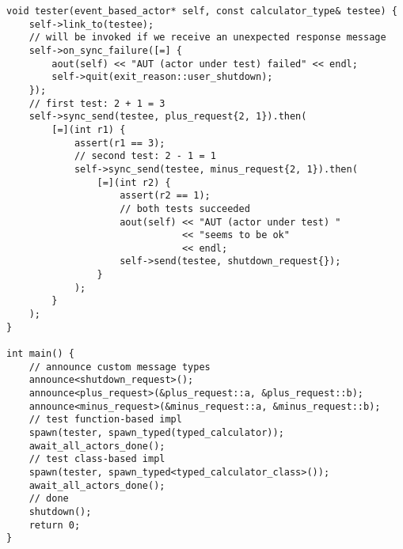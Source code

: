 \clearpage
\begin{lstlisting}
void tester(event_based_actor* self, const calculator_type& testee) {
    self->link_to(testee);
    // will be invoked if we receive an unexpected response message
    self->on_sync_failure([=] {
        aout(self) << "AUT (actor under test) failed" << endl;
        self->quit(exit_reason::user_shutdown);
    });
    // first test: 2 + 1 = 3
    self->sync_send(testee, plus_request{2, 1}).then(
        [=](int r1) {
            assert(r1 == 3);
            // second test: 2 - 1 = 1
            self->sync_send(testee, minus_request{2, 1}).then(
                [=](int r2) {
                    assert(r2 == 1);
                    // both tests succeeded
                    aout(self) << "AUT (actor under test) "
                               << "seems to be ok"
                               << endl;
                    self->send(testee, shutdown_request{});
                }
            );
        }
    );
}

int main() {
    // announce custom message types
    announce<shutdown_request>();
    announce<plus_request>(&plus_request::a, &plus_request::b);
    announce<minus_request>(&minus_request::a, &minus_request::b);
    // test function-based impl
    spawn(tester, spawn_typed(typed_calculator));
    await_all_actors_done();
    // test class-based impl
    spawn(tester, spawn_typed<typed_calculator_class>());
    await_all_actors_done();
    // done
    shutdown();
    return 0;
}
\end{lstlisting}
